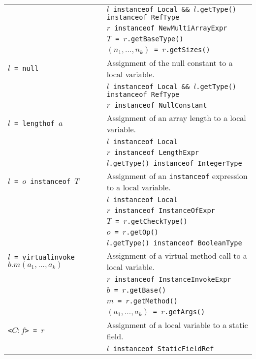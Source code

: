 \documentclass{article}
\begin{document}
\begin{scriptsize}
\begin{tabular}{ll}
                & \texttt{$l$ instanceof Local \&\& $l$.getType() instanceof RefType}\\
                & \texttt{$r$ instanceof NewMultiArrayExpr}\\
                & \texttt{$T$ = $r$.getBaseType()}\\
                & \texttt{$(n_1,\ldots,n_k)$ = $r$.getSizes()}\\
\hline
\texttt{$l$ = null}                & Assignment of the null constant to a local variable.\\
                & \texttt{$l$ instanceof Local \&\& $l$.getType() instanceof RefType}\\
                & \texttt{$r$ instanceof NullConstant}\\
\hline
\texttt{$l$ = lengthof $a$}    & Assignment of an array length to a local variable.\\
                & \texttt{$l$ instanceof Local}\\
                & \texttt{$r$ instanceof LengthExpr}\\
                & \texttt{$l$.getType() instanceof IntegerType}\\
\hline
\texttt{$l$ = $o$ instanceof $T$}    & Assignment of an \texttt{instanceof} expression to a local variable.\\
                & \texttt{$l$ instanceof Local}\\
                & \texttt{$r$ instanceof InstanceOfExpr}\\
                & \texttt{$T$ = $r$.getCheckType()}\\
                & \texttt{$o$ = $r$.getOp()}\\
                & \texttt{$l$.getType() instanceof BooleanType}\\
\hline
\texttt{$l$ = virtualinvoke $b.m(a_1,\ldots,a_k)$}              & Assignment of a virtual method call to a local variable.\\
                & \texttt{$r$ instanceof InstanceInvokeExpr}\\
                & \texttt{$b$ = $r$.getBase()}\\
                & \texttt{$m$ = $r$.getMethod()}\\
                & \texttt{$(a_1,\ldots,a_k)$ = $r$.getArgs()}\\
\hline
\texttt{<$C:f$> = $r$}       & Assignment of a local variable to a static field.\\
                & \texttt{$l$ instanceof StaticFieldRef}\\

\end{tabular}
\end{scriptsize}
\end{document}
